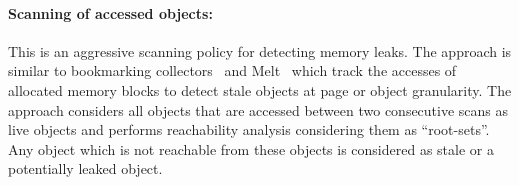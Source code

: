 


\paragraph{Scanning of accessed objects:} This is an aggressive scanning policy for detecting memory leaks. The approach is similar to bookmarking collectors~\cite{Hertz:2005:GCW:1065010.1065028} and Melt~\cite{Bond:2008:TML:1449764.1449774} which track the accesses of allocated memory blocks to detect stale objects at page or object granularity. The approach considers all objects that are accessed between two consecutive scans as live objects and performs reachability analysis considering them as ``root-sets''. Any object which is not reachable from these objects is considered as stale or a potentially leaked object. 


